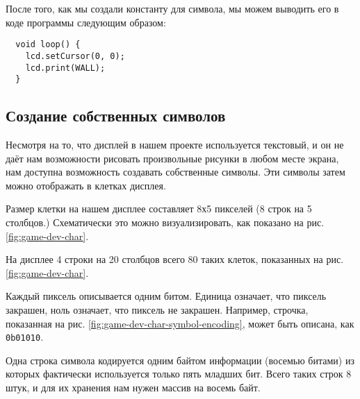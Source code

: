\documentclass[../sparc.tex]{subfiles}
\begin{document}
После того, как мы создали константу для символа, мы можем выводить его в коде
программы следующим образом:

\begin{verbatim}
  void loop() {
    lcd.setCursor(0, 0);
    lcd.print(WALL);
  }
\end{verbatim}

\subsection{Создание собственных символов}

Несмотря на то, что дисплей в нашем проекте используется текстовый, и он не даёт
нам возможности рисовать произвольные рисунки в любом месте экрана, нам доступна
возможность создавать собственные символы.  Эти символы затем можно отображать в
клетках дисплея.

Размер клетки на нашем дисплее составляет 8х5 пикселей (8 строк на 5 столбцов.)
Схематически это можно визуализировать, как показано на
рис. \ref{fig:game-dev-char}.


На дисплее 4 строки на 20 столбцов всего 80 таких клеток, показанных на рис.
\ref{fig:game-dev-char}.

Каждый пиксель описывается одним битом. Единица означает, что пиксель закрашен,
ноль означает, что пиксель не закрашен. Например, строчка, показанная на рис.
\ref{fig:game-dev-char-symbol-encoding}, может быть описана, как
\texttt{0b01010}.



Одна строка символа кодируется одним байтом информации (восемью битами) из
которых фактически используется только пять младших бит.  Всего таких строк 8
штук, и для их хранения нам нужен массив на восемь байт.
\end{document}
